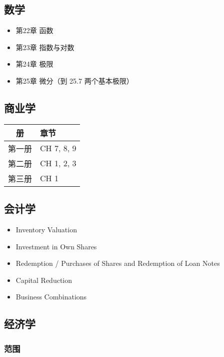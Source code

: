 \documentclass[
]{article}
\begin{document}
\subsection{数学}\label{ux6570ux5b66}

\begin{itemize}
\item
  第22章 函数
\item
  第23章 指数与对数
\item
  第24章 极限
\item
  第25章 微分（到 25.7 两个基本极限）
\end{itemize}

\subsection{商业学}\label{ux5546ux4e1aux5b66}

\begin{tabularx}{\textwidth}{cZ}
\toprule
册 & 章节 \\
\bottomrule
第一册 & CH 7, 8, 9 \\
\midrule
第二册 & CH 1, 2, 3 \\
\midrule
第三册 & CH 1 \\
\bottomrule
\end{tabularx}

\newpage
\subsection{会计学}\label{ux4f1aux8ba1ux5b66}

\begin{itemize}
\item
  Inventory Valuation
\item
  Investment in Own Shares
\item
  Redemption / Purchases of Shares and Redemption of Loan Notes
\item
  Capital Reduction
\item
  Business Combinations
\end{itemize}

\subsection{经济学}\label{ux7ecfux6d4eux5b66}

\subsubsection{范围}\label{ux8303ux56f4}
\end{document}
